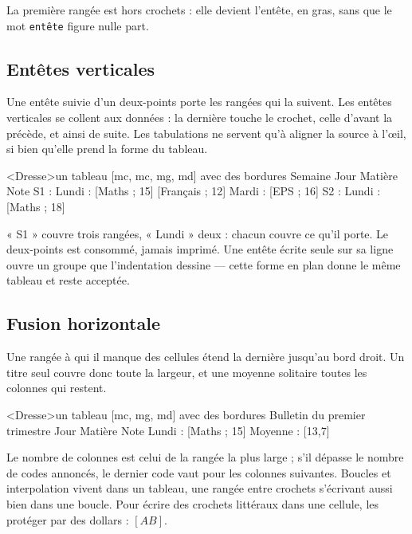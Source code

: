 \documentclass[11pt,a4paper]{article}
\newcommand{\bal}[1]{\texttt{#1}}
\begin{document}
La première rangée est hors crochets : elle devient l'entête, en gras,
sans que le mot \bal{entête} figure nulle part.

\subsection{Entêtes verticales}

Une entête suivie d'un deux-points porte les rangées qui la suivent.
Les entêtes verticales se collent aux données : la dernière touche le
crochet, celle d'avant la précède, et ainsi de suite. Les tabulations ne
servent qu'à aligner la source à l'œil, si bien qu'elle prend la forme du
tableau.

\begin{code}
<Dresse>un tableau [mc, mc, mg, md] avec des bordures{
    Semaine   Jour      Matière   Note
    S1 :      Lundi :   [Maths ; 15]
                        [Français ; 12]
              Mardi :   [EPS ; 16]
    S2 :      Lundi :   [Maths ; 18]
}
\end{code}

« S1 » couvre trois rangées, « Lundi » deux : chacun couvre ce qu'il
porte. Le deux-points est consommé, jamais imprimé. Une entête écrite
seule sur sa ligne ouvre un groupe que l'indentation dessine --- cette
forme en plan donne le même tableau et reste acceptée.

\subsection{Fusion horizontale}

Une rangée à qui il manque des cellules étend la dernière jusqu'au bord
droit. Un titre seul couvre donc toute la largeur, et une moyenne
solitaire toutes les colonnes qui restent.

\begin{code}
<Dresse>un tableau [mc, mg, md] avec des bordures{
    Bulletin du premier trimestre
    Jour        Matière   Note
    Lundi :     [Maths ; 15]
    Moyenne :   [13,7]
}
\end{code}

Le nombre de colonnes est celui de la rangée la plus large ; s'il dépasse
le nombre de codes annoncés, le dernier code vaut pour les colonnes
suivantes. Boucles et interpolation vivent dans un tableau, une rangée
entre crochets s'écrivant aussi bien dans une boucle. Pour écrire des
crochets littéraux dans une cellule, les protéger par des dollars :
\bal{$[AB]$}.
\end{document}
